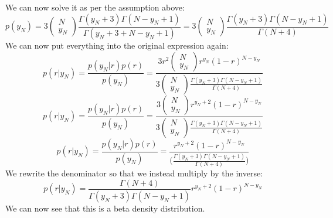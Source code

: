 We can now solve it as per the assumption above:
$$
p(y_N) = 3\begin{pmatrix} N\\ y_N \end{pmatrix} \frac{\Gamma(y_N+3)\Gamma(N-y_N+1)}{\Gamma(y_N+3 + N-y_N+1)} = 3\begin{pmatrix} N\\ y_N \end{pmatrix} \frac{\Gamma(y_N+3)\Gamma(N-y_N+1)}{\Gamma(N+4)}
$$
We can now put everything into the original expression again:
$$
p(r|y_N) = \frac{p(y_N|r)p(r)}{p(y_N)} = \frac{3r^2\begin{pmatrix} N\\ y_N \end{pmatrix} r^{y_N} (1-r)^{N-y_N}}{3\begin{pmatrix} N\\ y_N \end{pmatrix} \frac{\Gamma(y_N+3)\Gamma(N-y_N+1)}{\Gamma(N+4)}}
$$
$$
p(r|y_N) = \frac{p(y_N|r)p(r)}{p(y_N)} = \frac{3\begin{pmatrix} N\\ y_N \end{pmatrix} r^{y_N+2} (1-r)^{N-y_N}}{3\begin{pmatrix} N\\ y_N \end{pmatrix} \frac{\Gamma(y_N+3)\Gamma(N-y_N+1)}{\Gamma(N+4)}}
$$
$$
p(r|y_N) = \frac{p(y_N|r)p(r)}{p(y_N)} = \frac{r^{y_N+2} (1-r)^{N-y_N}}{\Big(\frac{\Gamma(y_N+3)\Gamma(N-y_N+1)}{\Gamma(N+4)}\Big)}
$$
We rewrite the denominator so that we instead multiply by the inverse:
$$
p(r|y_N) = \frac{\Gamma(N+4)}{\Gamma(y_N+3)\Gamma(N-y_N+1)}r^{y_N+2} (1-r)^{N-y_N}
$$
We can now see that this is a beta density distribution.